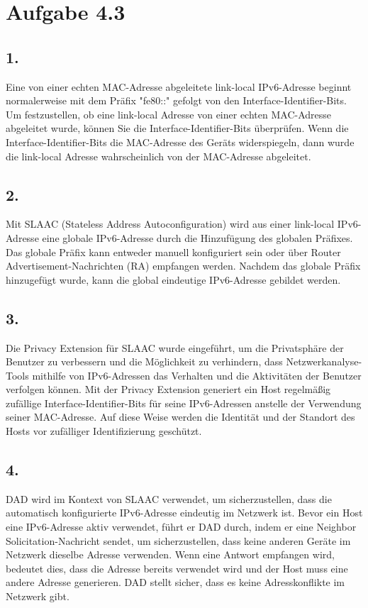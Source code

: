 \documentclass[a4paper]{scrartcl}
\begin{document}
\section*{Aufgabe 4.3}
\subsection*{1.}
Eine von einer echten MAC-Adresse abgeleitete link-local IPv6-Adresse beginnt normalerweise mit dem Präfix "fe80::" gefolgt von den Interface-Identifier-Bits. Um festzustellen, ob eine link-local Adresse von einer echten MAC-Adresse abgeleitet wurde, können Sie die Interface-Identifier-Bits überprüfen. Wenn die Interface-Identifier-Bits die MAC-Adresse des Geräts widerspiegeln, dann wurde die link-local Adresse wahrscheinlich von der MAC-Adresse abgeleitet.
\subsection*{2.}
Mit SLAAC (Stateless Address Autoconfiguration) wird aus einer link-local IPv6-Adresse eine globale IPv6-Adresse durch die Hinzufügung des globalen Präfixes. Das globale Präfix kann entweder manuell konfiguriert sein oder über Router Advertisement-Nachrichten (RA) empfangen werden. Nachdem das globale Präfix hinzugefügt wurde, kann die global eindeutige IPv6-Adresse gebildet werden.
\subsection*{3.}
Die Privacy Extension für SLAAC wurde eingeführt, um die Privatsphäre der Benutzer zu verbessern und die Möglichkeit zu verhindern, dass Netzwerkanalyse-Tools mithilfe von IPv6-Adressen das Verhalten und die Aktivitäten der Benutzer verfolgen können. Mit der Privacy Extension generiert ein Host regelmäßig zufällige Interface-Identifier-Bits für seine IPv6-Adressen anstelle der Verwendung seiner MAC-Adresse. Auf diese Weise werden die Identität und der Standort des Hosts vor zufälliger Identifizierung geschützt.
\subsection*{4.}
DAD wird im Kontext von SLAAC verwendet, um sicherzustellen, dass die automatisch konfigurierte IPv6-Adresse eindeutig im Netzwerk ist. Bevor ein Host eine IPv6-Adresse aktiv verwendet, führt er DAD durch, indem er eine Neighbor Solicitation-Nachricht sendet, um sicherzustellen, dass keine anderen Geräte im Netzwerk dieselbe Adresse verwenden. Wenn eine Antwort empfangen wird, bedeutet dies, dass die Adresse bereits verwendet wird und der Host muss eine andere Adresse generieren. DAD stellt sicher, dass es keine Adresskonflikte im Netzwerk gibt.
\end{document}
